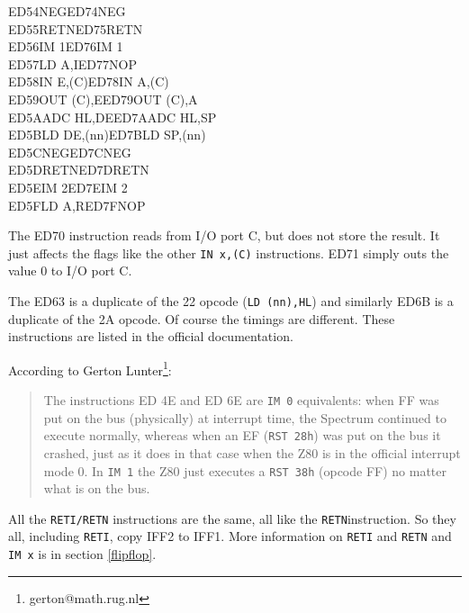 \documentclass[oneside,a4paper]{book}
\begin{document}
{\begin{tabbing}
		{\qquad}ED54\>NEG{\footnotemark[7]}\>ED74\>NEG{\footnotemark[7]}\\
		{\qquad}ED55\>RETN{\footnotemark[7]}\>ED75\>RETN{\footnotemark[7]}\\
		{\qquad}ED56\>IM 1\>ED76\>IM 1{\footnotemark[7]}\\
		{\qquad}ED57\>LD A,I\>ED77\>NOP{\footnotemark[7]}\\
		{\qquad}ED58\>IN E,(C)\>ED78\>IN A,(C)\\
		{\qquad}ED59\>OUT (C),E\>ED79\>OUT (C),A\\
		{\qquad}ED5A\>ADC HL,DE\>ED7A\>ADC HL,SP\\
		{\qquad}ED5B\>LD DE,(nn)\>ED7B\>LD SP,(nn)\\
		{\qquad}ED5C\>NEG{\footnotemark[7]}\>ED7C\>NEG{\footnotemark[7]}\\
		{\qquad}ED5D\>RETN{\footnotemark[7]}\>ED7D\>RETN{\footnotemark[7]}\\
		{\qquad}ED5E\>IM 2\>ED7E\>IM 2{\footnotemark[7]}\\
		{\qquad}ED5F\>LD A,R\>ED7F\>NOP{\footnotemark[7]}\\
	\end{tabbing}
}
\renewcommand{\thefootnote}{\arabic{footnote}}

The ED70 instruction reads from I/O port C, but does not store the result. It just affects the flags like the other {\tt IN x,(C)} instructions. ED71 simply outs the value 0 to I/O port C.

The ED63 is a duplicate of the 22 opcode ({\tt LD (nn),HL}) and similarly ED6B is a duplicate of the 2A opcode. Of course the timings are different. These instructions are listed in the official documentation.

According to Gerton Lunter\footnote{gerton@math.rug.nl}:

\begin{quote}
	The instructions ED 4E and ED 6E are {\tt IM 0} equivalents: when FF was put on the bus (physically) at interrupt time, the Spectrum continued to execute normally, whereas when an EF ({\tt RST 28h}) was put on the bus it crashed, just as it does in that case when the Z80 is in the official interrupt mode 0. In {\tt IM 1} the Z80 just executes a {\tt RST 38h} (opcode FF) no matter what is on the bus.
\end{quote}

All the {\tt RETI/RETN} instructions are the same, all like the {\tt RETN}instruction. So they all, including {\tt RETI}, copy IFF2 to IFF1. More information on {\tt RETI} and {\tt RETN} and {\tt IM x} is in section \ref{flipflop}.
\end{document}

